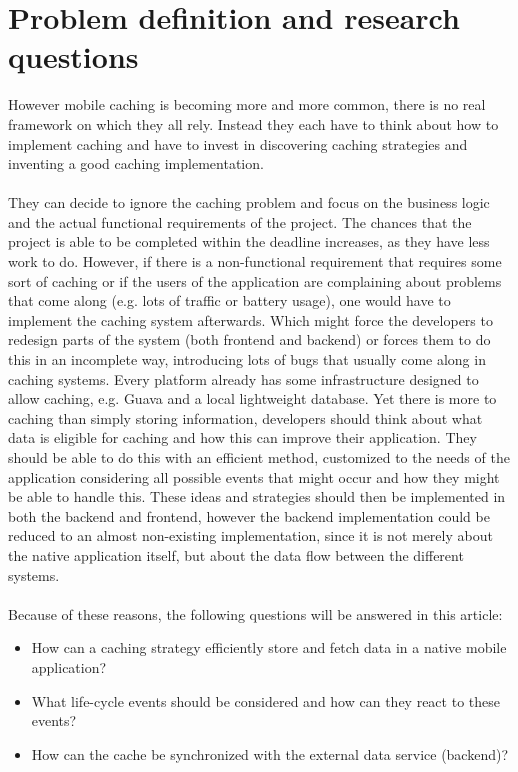 \documentclass[pdftex,a4paper,12pt,twoside]{report}
\begin{document}
\section{Problem definition and research questions}
However mobile caching is becoming more and more common, there is no real framework on which they all rely. Instead they each have to think about how to implement
caching and have to invest in discovering caching strategies and inventing a good caching implementation.
\\\\
They can decide to ignore the caching problem and focus on the business logic and the actual functional requirements of the project. The chances that the
project is able to be completed within the deadline increases, as they have less work to do. However, if there is a non-functional requirement that requires some sort of caching
or if the users of the application are complaining about problems that come along (e.g. lots of traffic or battery usage), one would have to implement the caching system afterwards. Which might force the developers to redesign parts of the system (both frontend and backend) or forces them to do this in an incomplete way, introducing lots of bugs that usually come along in caching systems.
\label{sec:research questions}
Every platform already has some infrastructure designed to allow caching, e.g. Guava and a local lightweight database.
Yet there is more to caching than simply storing information, developers should think about what data is eligible for caching and how this can improve their application.
They should be able to do this with an efficient method, customized to the needs of the application considering all possible events that might occur and how they might be able to handle this. These ideas and strategies should then be implemented in both the backend and frontend, however the backend implementation could be reduced to an almost non-existing implementation, since it is not merely about the native application itself, but about the data flow between the different systems.
\\\\Because of these reasons, the following questions will be answered in this article:
\begin{itemize}
\item How can a caching strategy efficiently store and fetch data in a native mobile application?
\item What life-cycle events should be considered and how can they react to these events?
\item How can the cache be synchronized with the external data service (backend)?
\end{itemize}
\end{document}
